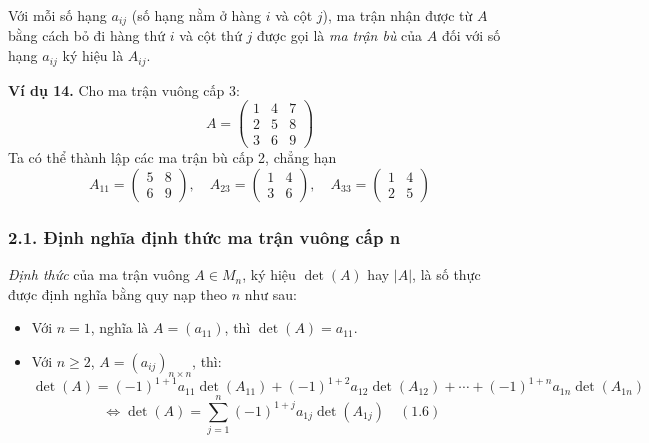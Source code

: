 Với mỗi số hạng \( a_{ij} \) (số hạng nằm ở hàng \( i \) và cột \( j \)), ma trận nhận được từ \( A \) bằng cách bỏ đi hàng thứ \( i \) và cột thứ \( j \) được gọi là \textit{ma trận bù} của \( A \) đối với số hạng \( a_{ij} \) ký hiệu là \( A_{ij} \).

\textbf{Ví dụ 14.} Cho ma trận vuông cấp 3:
\[
A = \begin{pmatrix}
1 & 4 & 7 \\
2 & 5 & 8 \\
3 & 6 & 9
\end{pmatrix}
\]
Ta có thể thành lập các ma trận bù cấp 2, chẳng hạn
\[
A_{11} = \begin{pmatrix}
5 & 8 \\
6 & 9
\end{pmatrix}
, \quad
A_{23} = \begin{pmatrix}
1 & 4 \\
3 & 6
\end{pmatrix}
, \quad
A_{33} = \begin{pmatrix}
1 & 4 \\
2 & 5
\end{pmatrix}
\]

\subsubsection*{2.1. Định nghĩa định thức ma trận vuông cấp n}
\textit{Định thức} của ma trận vuông \( A \in M_n \), ký hiệu \(\det(A)\) hay \(|A|\), là số thực được định nghĩa bằng quy nạp theo \( n \) như sau:
\begin{itemize}
    \item Với \( n = 1 \), nghĩa là \( A = (a_{11}) \), thì \(\det(A) = a_{11}\).
    \item Với \( n \ge 2 \), \( A = (a_{ij})_{n \times n} \), thì:
    \[
    \det(A) = (-1)^{1+1}a_{11}\det(A_{11}) + (-1)^{1+2}a_{12}\det(A_{12}) + \cdots + (-1)^{1+n}a_{1n}\det(A_{1n})
    \]
    \[
    \Leftrightarrow \det(A) = \sum_{j=1}^n (-1)^{1+j} a_{1j} \det(A_{1j}) \quad (1.6)
    \]
\end{itemize}

